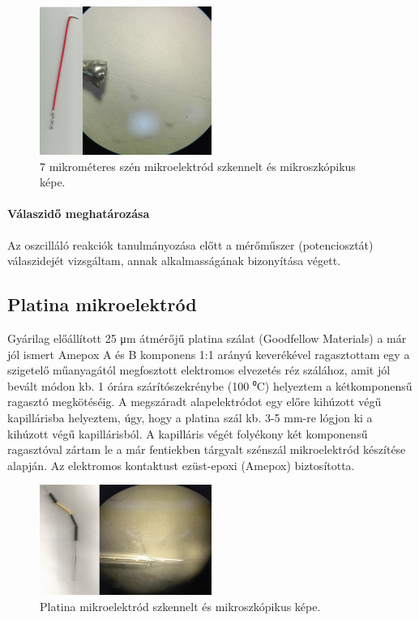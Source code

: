 \begin{figure}[h]
\centering
\includegraphics[width=0.5\textwidth]{img/szenmikro.png}
\caption{7 mikrométeres szén mikroelektród szkennelt és mikroszkópikus képe.}
\label{fig:ionophores}
\end{figure}

\paragraph{Válaszidő meghatározása}
Az oszcilláló reakciók tanulmányozása előtt a mérőműszer (potenciosztát) válaszidejét vizsgáltam, annak alkalmasságának bizonyítása végett.
\subsection{Platina mikroelektród}
Gyárilag előállított 25 μm átmérőjű platina szálat (Goodfellow Materials) a már jól ismert Amepox A és B komponens 1:1 arányú keverékével ragasztottam egy a szigetelő műanyagától megfosztott elektromos elvezetés réz szálához, amit jól bevált módon kb. 1 órára szárítószekrénybe (100 ⁰C) helyeztem a kétkomponensű ragasztó megkötéséig.  A megszáradt alapelektródot egy előre kihúzott végű kapillárisba helyeztem, úgy, hogy a platina szál kb. 3-5 mm-re lógjon ki a kihúzott végű kapillárisból. A kapilláris végét folyékony két komponensű ragasztóval zártam le a már fentiekben tárgyalt szénszál mikroelektród készítése alapján. Az elektromos kontaktust ezüst-epoxi (Amepox) biztosította.
\begin{figure}[h]
\centering
\includegraphics[width=0.5\textwidth]{img/platina.png}
\caption{Platina mikroelektród szkennelt és mikroszkópikus képe.}
\label{fig:ionophores}
\end{figure}
